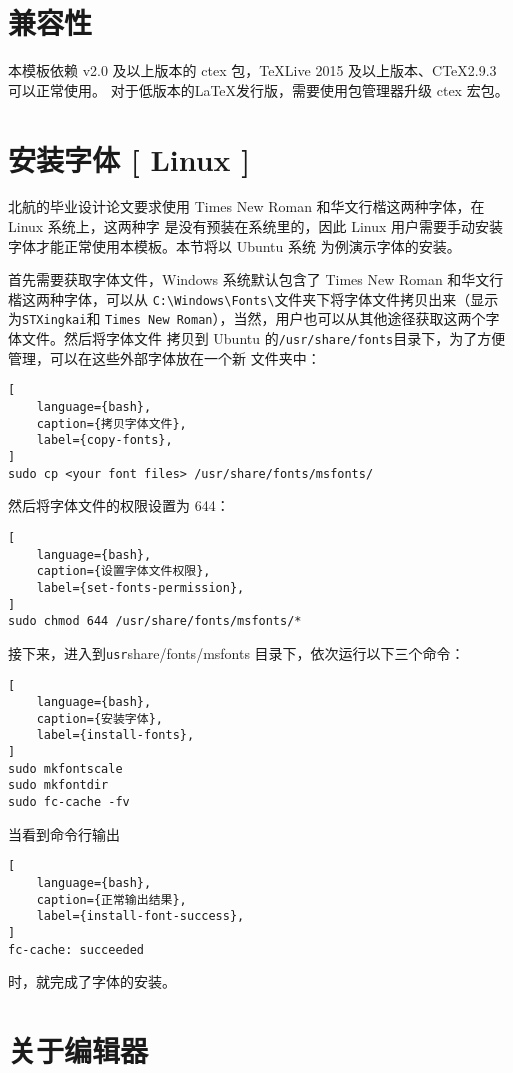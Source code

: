 \documentclass[master,openright,twoside,color,AutoFakeBold=true]{misc/buaathesis}
\begin{document}
\section{兼容性}

本模板依赖 v2.0 及以上版本的 ctex 包，\TeX{}Live 2015 及以上版本、C\TeX{}2.9.3 可以正常使用。
对于低版本的\LaTeX{}发行版，需要使用包管理器升级 ctex 宏包。

\section{安装字体 [ Linux ]}

北航的毕业设计论文要求使用 Times New Roman 和华文行楷这两种字体，在 Linux 系统上，这两种字
是没有预装在系统里的，因此 Linux 用户需要手动安装字体才能正常使用本模板。本节将以 Ubuntu 系统
为例演示字体的安装。

首先需要获取字体文件，Windows 系统默认包含了 Times New Roman 和华文行楷这两种字体，可以从
\verb|C:\Windows\Fonts\|文件夹下将字体文件拷贝出来（显示为\verb|STXingkai|和
\verb|Times New Roman|），当然，用户也可以从其他途径获取这两个字体文件。然后将字体文件
拷贝到 Ubuntu 的\verb|/usr/share/fonts|目录下，为了方便管理，可以在这些外部字体放在一个新
文件夹中：
\begin{lstlisting}[
    language={bash},
    caption={拷贝字体文件},
    label={copy-fonts},
]
sudo cp <your font files> /usr/share/fonts/msfonts/
\end{lstlisting}
然后将字体文件的权限设置为 644：
\begin{lstlisting}[
    language={bash},
    caption={设置字体文件权限},
    label={set-fonts-permission},
]
sudo chmod 644 /usr/share/fonts/msfonts/*
\end{lstlisting}
接下来，进入到{\verb /usr/share/fonts/msfonts } 目录下，依次运行以下三个命令：
\begin{lstlisting}[
    language={bash},
    caption={安装字体},
    label={install-fonts},
]
sudo mkfontscale
sudo mkfontdir
sudo fc-cache -fv
\end{lstlisting}
当看到命令行输出
\begin{lstlisting}[
    language={bash},
    caption={正常输出结果},
    label={install-font-success},
]
fc-cache: succeeded
\end{lstlisting}
时，就完成了字体的安装。

\section{关于编辑器}
\end{document}
